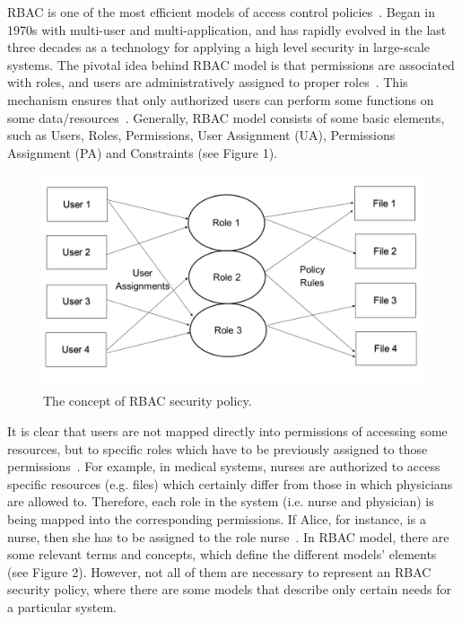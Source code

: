 RBAC is one of the most efficient models of access control policies~\cite{AhHu2007}.  Began in 1970s with multi-user and multi-application, and has rapidly evolved in the last three decades as a technology for applying a high level security in large-scale systems.  The pivotal idea behind RBAC model is that permissions are associated with roles, and users are administratively assigned to proper roles~\cite{Zha2008}. This mechanism ensures that only authorized users can perform some functions on some data/resources~\cite{FeKu2009}. Generally, RBAC model consists of some basic elements, such as Users, Roles, Permissions, User Assignment (UA), Permissions Assignment (PA) and Constraints (see Figure 1).

\begin{figure}[bht]
\centering
\includegraphics[scale=0.26]{RBACpolicy.png}
\caption{The concept of RBAC security policy.}
\label{fig:RBACPol}
\end{figure}

It is clear that users are not mapped directly into permissions of accessing some resources, but to specific roles which have to be previously assigned to those permissions~\cite{YuBr2012}.  For example, in medical systems, nurses are authorized to access specific resources (e.g. files) which certainly differ from those in which physicians are allowed to.  Therefore, each role in the system (i.e. nurse and physician) is being mapped into the corresponding permissions.  If Alice, for instance, is a nurse, then she has to be assigned to the role nurse~\cite{DBS2004}. 
      In RBAC model, there are some relevant terms and concepts, which define the different models' elements~\cite{SDAG2008} (see Figure 2).  However, not all of them are necessary to represent an RBAC security policy, where there are some models that describe only certain needs for a particular system.

